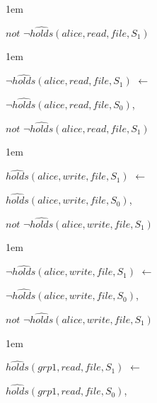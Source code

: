 \documentclass[global,twocolumn,final]{svjour}
\newenvironment{vexample}
  {\begin{example}\hspace{0.25em}}
  {\end{example}}
\newenvironment{vquote}
  {\begin{list}{}{\leftmargin 1em}\item[]}
  {\end{list}}
\begin{document}
\begin{vexample}
\begin{enumerate}
\begin{vquote}
                \hspace{1em}
                $not$ $\lnot\hat{holds}(alice, read, file, S_{1})$
              \end{vquote}

              \begin{vquote}
                $\lnot\hat{holds}(alice, read, file, S_{1})$ $\leftarrow$

                \hspace{1em}
                $\lnot\hat{holds}(alice, read, file, S_{0})$,

                \hspace{1em}
                $not$ $\lnot\hat{holds}(alice, read, file, S_{1})$
              \end{vquote}

              \begin{vquote}
                $\hat{holds}(alice, write, file, S_{1})$ $\leftarrow$

                \hspace{1em}
                $\hat{holds}(alice, write, file, S_{0})$,

                \hspace{1em}
                $not$ $\lnot\hat{holds}(alice, write, file, S_{1})$
              \end{vquote}

              \begin{vquote}
                $\lnot\hat{holds}(alice, write, file, S_{1})$ $\leftarrow$

                \hspace{1em}
                $\lnot\hat{holds}(alice, write, file, S_{0})$,

                \hspace{1em}
                $not$ $\lnot\hat{holds}(alice, write, file, S_{1})$
              \end{vquote}

              \begin{vquote}
                $\hat{holds}(grp1, read, file, S_{1})$ $\leftarrow$

                \hspace{1em}
                $\hat{holds}(grp1, read, file, S_{0})$,


\end{vquote}
\end{enumerate}
\end{vexample}
\end{document}

